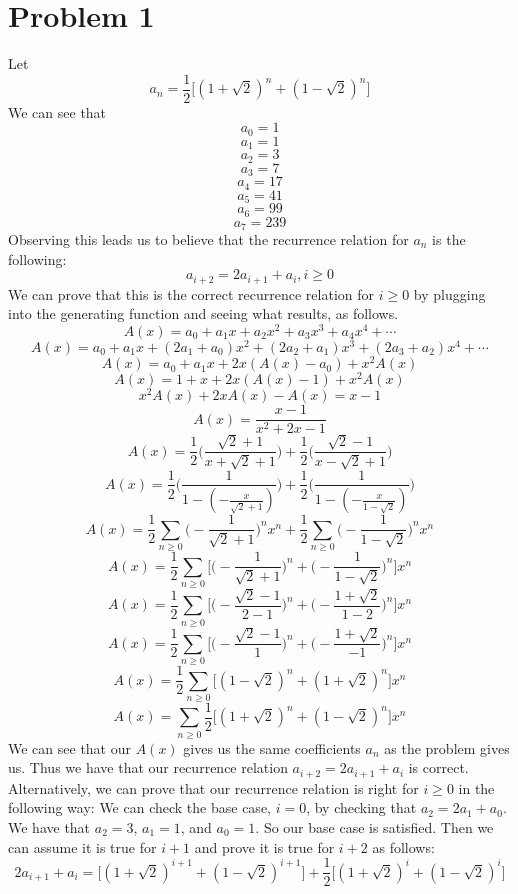 \documentclass{article}
\begin{document}
\section*{Problem 1}
Let
\[ a_n = \frac{1}{2} \Big[ (1 + \sqrt2)^n + (1 - \sqrt2)^n \Big] \]
We can see that
\[ a_0 = 1 \]
\[ a_1 = 1 \]
\[ a_2 = 3 \]
\[ a_3 = 7 \]
\[ a_4 = 17 \]
\[ a_5 = 41 \]
\[ a_6 = 99 \]
\[ a_7 = 239 \]
Observing this leads us to believe that the recurrence relation for $a_n$
is the following:
\[ a_{i+2} = 2a_{i+1} + a_i, i \geq 0 \]
We can prove that this is the correct recurrence relation for $i \geq 0$
by plugging into the generating function and seeing what results, as follows.
\[ A(x) = a_0 + a_1x + a_2x^2 + a_3x^3 + a_4x^4 + \cdots \]
\[ A(x) = a_0 + a_1x + (2a_1 + a_0)x^2 + (2a_2 + a_1)x^3 + (2a_3 + a_2)x^4
    + \cdots \]
\[ A(x) = a_0 + a_1x + 2x(A(x) - a_0) + x^2A(x) \]
\[ A(x) = 1 + x + 2x(A(x) - 1) + x^2A(x) \]
\[ x^2A(x) + 2xA(x) - A(x) = x - 1 \]
\[ A(x) = \frac{x-1}{x^2 + 2x - 1} \]
\[ A(x) = \frac{1}{2} \Big( \frac{\sqrt2 + 1}{x + \sqrt2 + 1} \Big)
    + \frac{1}{2} \Big( \frac{\sqrt2 - 1}{x - \sqrt2 + 1} \Big) \]
\[ A(x) = \frac{1}{2} \Big( \frac{1}{1 - (-\frac{x}{\sqrt2 + 1})} \Big)
    + \frac{1}{2} \Big( \frac{1}{1 - (-\frac{x}{1 - \sqrt2})} \Big) \]
\[ A(x) = \frac{1}{2} \sum_{n \geq 0} \Big(-\frac{1}{\sqrt2 + 1} \Big)^n x^n
    + \frac{1}{2} \sum_{n \geq 0} \Big(-\frac{1}{1 - \sqrt2} \Big)^n x^n \]
\[ A(x) = \frac{1}{2} \sum_{n \geq 0} \Big[ \Big(-\frac{1}{\sqrt2 + 1} \Big)^n
    + \Big(-\frac{1}{1 - \sqrt2} \Big)^n \Big] x^n \]
\[ A(x) = \frac{1}{2} \sum_{n \geq 0} \Big[ \Big(-\frac{\sqrt2 - 1}{2 - 1} \Big)^n
    + \Big(-\frac{1 + \sqrt2}{1 - 2} \Big)^n \Big] x^n \]
\[ A(x) = \frac{1}{2} \sum_{n \geq 0} \Big[ \Big(-\frac{\sqrt2 - 1}{1} \Big)^n
    + \Big(-\frac{1 + \sqrt2}{-1} \Big)^n \Big] x^n \]
\[ A(x) = \frac{1}{2} \sum_{n \geq 0} \Big[ (1 - \sqrt2)^n
    + (1 + \sqrt2)^n \Big] x^n \]
\[ A(x) = \sum_{n \geq 0} \frac{1}{2} \Big[ (1 + \sqrt2)^n
    + (1 - \sqrt2)^n \Big] x^n \]
We can see that our $A(x)$ gives us the same coefficients $a_n$
as the problem gives us. Thus we have that our recurrence relation
$a_{i+2} = 2a_{i+1} + a_i$ is correct. Alternatively, we can prove
that our recurrence relation is right for $i \geq 0$ in the following way:
We can check the base case, $i = 0$, by checking that
$a_2 = 2a_1 + a_0$. We have that $a_2 = 3$, $a_1 = 1$, and $a_0 = 1$. So our
base case is satisfied. Then we can assume it is true for $i+1$ and prove it
is true for $i+2$ as follows:
\[ 2a_{i+1} + a_i
    = \Big[ (1 + \sqrt2)^{i+1} + (1 - \sqrt2)^{i+1} \Big]
    + \frac{1}{2} \Big[ (1 + \sqrt2)^i + (1 - \sqrt2)^i \Big] \]
\end{document}
